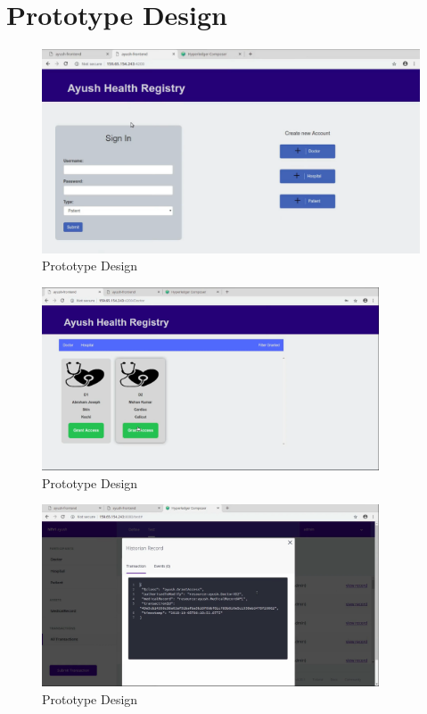 \documentclass[11pt]{report}
\begin{document}
   \section{Prototype Design} 
            \begin{figure}[h!]
        \centering
        \includegraphics[scale=0.3]{proto1.png}
        \caption{Prototype Design}
        \label{fig:my_label}
    \end{figure}
    \begin{figure}
        \centering
        \includegraphics[scale=0.3,width=10cm]{Proto2.png}
        \caption{Prototype Design}
        \label{fig:my_label}
    \end{figure}
    \begin{figure}
        \centering
        \includegraphics[scale=0.3,width=10cm]{Proto3.png}
        \caption{Prototype Design}
        \label{fig:my_label}
    \end{figure}
\end{document}

